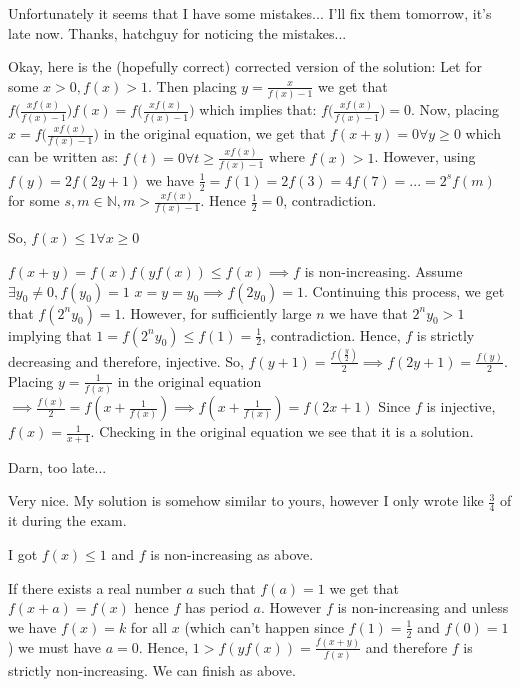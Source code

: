 \begin{solution}
	\begin{tcolorbox}

Unfortunately it seems that I have some mistakes... I'll fix them tomorrow, it's late now.
Thanks, hatchguy for noticing the mistakes...\end{tcolorbox}

Okay, here is the (hopefully correct) corrected version of the solution:
Let for some $x>0, f(x)>1$. Then placing $y=\frac{x}{f(x)-1}$ we get that ${{f(\frac{xf(x)}{f(x)-1}})f(x)=f(\frac{xf(x)}{f(x)-1}})$ which implies that:
${f(\frac{xf(x)}{f(x)-1}})=0$. Now, placing ${x=f(\frac{xf(x)}{f(x)-1}})$ in the original equation, we get that $f(x+y)=0 \forall y\geq 0$ which can be written as: $f(t)=0 \forall t\geq \frac{xf(x)}{f(x)-1}$ where $f(x)>1$.
However, using $f(y)=2f(2y+1)$ we have $\frac{1}{2}=f(1)=2f(3)=4f(7)=...=2^{s}f(m)$ for some $s,m \in\mathbb{N}, m>\frac{xf(x)}{f(x)-1}$. Hence $\frac{1}{2}=0$, contradiction.

So, $f(x)\leq 1 \forall x\geq 0$

$f(x+y)=f(x)f(yf(x))\leq f(x) \implies f$ is non-increasing.
Assume $\exists y_{0}\neq 0, f(y_{0})=1$
$x=y=y_{0} \implies f(2y_{0})=1$. Continuing this process, we get that $f(2^{n}y_{0})=1$.  However, for sufficiently large $n$ we have that $2^{n}y_{0}>1$ implying that $1=f(2^{n}y_{0})\leq f(1)=\frac{1}{2}$, contradiction.
Hence, $f$ is strictly decreasing and therefore, injective.
So, $ f(y+1)=\frac{f(\frac{y}{2})}{2} \implies  f(2y+1)=\frac{f(y)}{2}$.
Placing $y=\frac{1}{f(x)}$ in the original equation $\implies \frac{f(x)}{2}=f(x+\frac{1}{f(x)}) \implies f(x+\frac{1}{f(x)})=f(2x+1)$ Since $f$ is injective, $f(x)=\frac{1}{x+1}$. Checking in the original equation we see that it is a solution.


Darn, too late...
\end{solution}



\begin{solution}
	Very nice. My solution is somehow similar to yours, however I only wrote like $\frac{3}{4}$ of it during the exam.

I got $f(x) \le 1$ and $f$ is non-increasing as above.

If there exists a real number $a$ such that $f(a) =1$ we get that $f(x+a) = f(x)$ hence $f$ has period $a$. However $f$ is non-increasing and unless we have $f(x) = k$ for all $x$ (which can't happen since $f(1) =\frac{1}{2}$ and $f(0) = 1$) we must have $a = 0$. Hence, $1 > f(yf(x)) = \frac{f(x+y)}{f(x)}$ and therefore $f$ is strictly non-increasing. We can finish as above.
\end{solution}



